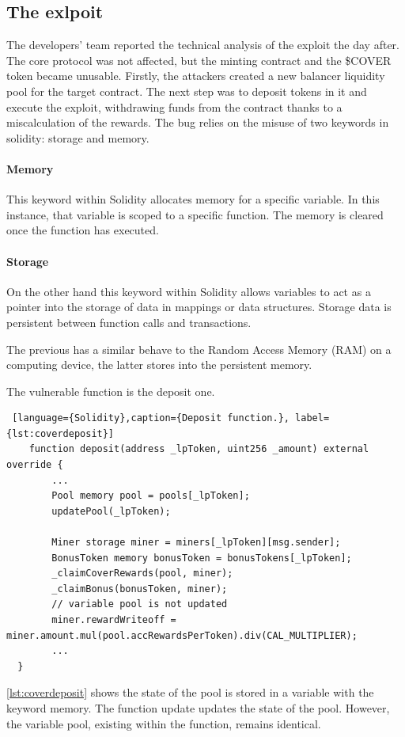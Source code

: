 \subsection{The exlpoit}
\label{sec:CoverProtocol:Exploit}
The developers' team reported \citep{CoverProtocolPostMortem} the technical analysis of the exploit the day after.
The core protocol was not affected, 
but the minting contract and the \$COVER token became unusable.
Firstly, the attackers created a new balancer liquidity pool for the target contract. The next step was to deposit tokens in it and execute the exploit, 
withdrawing funds from the contract thanks to a miscalculation of the rewards.
The bug relies on the misuse of two keywords in solidity: storage and memory. 

\paragraph{Memory} This keyword within Solidity allocates memory for a specific variable. 
In this instance, that variable is scoped to a specific function. 
The memory is cleared once the function has executed.

\paragraph{Storage} On the other hand this keyword within Solidity allows variables to act as a pointer into the storage of data in mappings or data structures. 
Storage data is persistent between function calls and transactions. 

The previous has a similar behave to the Random Access Memory (RAM) on a computing device, the latter stores into the persistent memory.

The vulnerable function is the deposit one.

\begin{lstlisting} [language={Solidity},caption={Deposit function.}, label={lst:coverdeposit}]
    function deposit(address _lpToken, uint256 _amount) external override {
        ...
        Pool memory pool = pools[_lpToken];
        updatePool(_lpToken);

        Miner storage miner = miners[_lpToken][msg.sender];
        BonusToken memory bonusToken = bonusTokens[_lpToken];
        _claimCoverRewards(pool, miner);
        _claimBonus(bonusToken, miner);
        // variable pool is not updated
        miner.rewardWriteoff = miner.amount.mul(pool.accRewardsPerToken).div(CAL_MULTIPLIER); 
        ...
  }
\end{lstlisting}
\autoref{lst:coverdeposit} shows the state of the pool is stored in a variable with the keyword memory. 
The function update updates the state of the pool. 
However, the variable pool, existing within the function, remains identical. 

